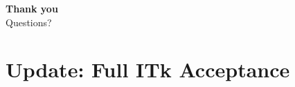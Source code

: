\documentclass[xcolor=table,aspectratio=169]{beamer}
\begin{document}
\begin{frame}[plain]
    \centering
    \vfill
    {\Large\textbf{\textcolor{pennred}{Thank you}}}\\[0.4em]
    {\normalsize Questions?}
    \vfill
\end{frame}



\section{Update: Full ITk Acceptance}
\end{document}
